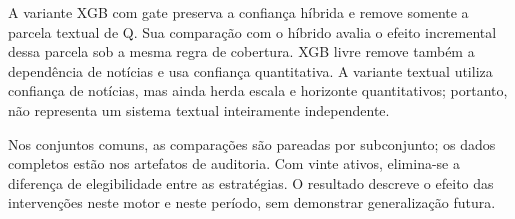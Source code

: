 A variante XGB com gate preserva a confiança híbrida e remove somente a parcela textual de Q. Sua comparação com o híbrido avalia o efeito incremental dessa parcela sob a mesma regra de cobertura. XGB livre remove também a dependência de notícias e usa confiança quantitativa. A variante textual utiliza confiança de notícias, mas ainda herda escala e horizonte quantitativos; portanto, não representa um sistema textual inteiramente independente.

Nos conjuntos comuns, as comparações são pareadas por subconjunto; os dados completos estão nos artefatos de auditoria. Com vinte ativos, elimina-se a diferença de elegibilidade entre as estratégias. O resultado descreve o efeito das intervenções neste motor e neste período, sem demonstrar generalização futura.